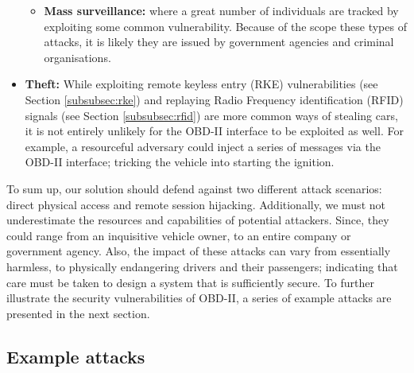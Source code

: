 \begin{itemize}
\begin{itemize}
		\item \textbf{Mass surveillance:} where a great number of individuals are tracked by exploiting some common vulnerability. Because of the scope these types of attacks, it is likely they are issued by government agencies and criminal organisations.
	\end{itemize}
	
	
	\item \textbf{Theft:} While exploiting remote keyless entry (RKE) vulnerabilities (see Section \ref{subsubsec:rke}) and replaying Radio Frequency identification (RFID) signals (see Section \ref{subsubsec:rfid}) are more common ways of stealing cars, it is not entirely unlikely for the OBD-II interface to be exploited as well. For example, a resourceful adversary could inject a series of messages via the OBD-II interface; tricking the vehicle into starting the ignition.	
\end{itemize}

To sum up, our solution should defend against two different attack scenarios: direct physical access and remote session hijacking. Additionally, we must not underestimate the resources and capabilities of potential attackers. Since, they could range from an inquisitive vehicle owner, to an entire company or government agency. Also, the impact of these attacks can vary from essentially harmless, to physically endangering drivers and their passengers; indicating that care must be taken to design a system that is sufficiently secure. To further illustrate the security vulnerabilities of OBD-II, a series of example attacks are presented in the next section.

\subsection{Example attacks}
\label{subsec:example_attacks}

